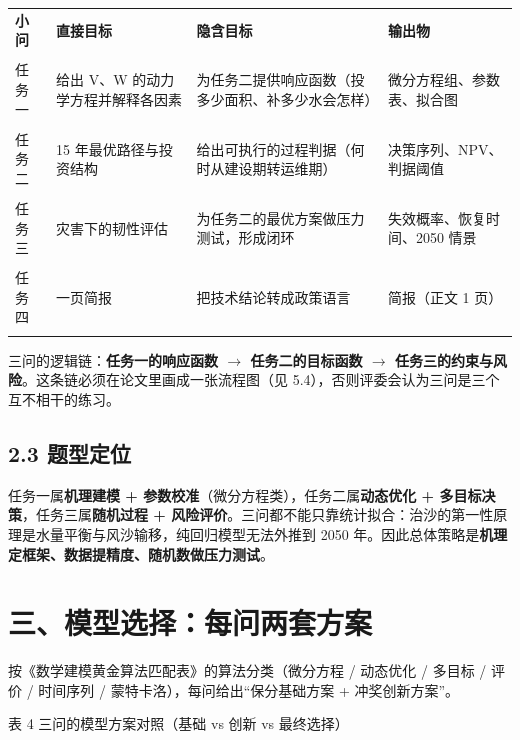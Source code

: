 \documentclass[11pt,a4paper]{ctexart}
\begin{document}
\begin{table}[H]\centering\small\setlength{\parskip}{2pt}
\begin{tabularx}{\textwidth}{|X|X|X|X|}
\toprule
\textbf{小问} & \textbf{直接目标} & \textbf{隐含目标} & \textbf{输出物} \\\\
\midrule
任务一 & 给出 V、W 的动力学方程并解释各因素 & 为任务二提供响应函数（投多少面积、补多少水会怎样） & 微分方程组、参数表、拟合图 \\\\
任务二 & 15 年最优路径与投资结构 & 给出可执行的过程判据（何时从建设期转运维期） & 决策序列、NPV、判据阈值 \\\\
任务三 & 灾害下的韧性评估 & 为任务二的最优方案做压力测试，形成闭环 & 失效概率、恢复时间、2050 情景 \\\\
任务四 & 一页简报 & 把技术结论转成政策语言 & 简报（正文 1 页） \\\\
\bottomrule
\end{tabularx}
\end{table}
三问的逻辑链：\textbf{任务一的响应函数 $\to$ 任务二的目标函数 $\to$ 任务三的约束与风险}。这条链必须在论文里画成一张流程图（见 5.4），否则评委会认为三问是三个互不相干的练习。


\subsection*{2.3 题型定位}
任务一属\textbf{机理建模 + 参数校准}（微分方程类），任务二属\textbf{动态优化 + 多目标决策}，任务三属\textbf{随机过程 + 风险评价}。三问都不能只靠统计拟合：治沙的第一性原理是水量平衡与风沙输移，纯回归模型无法外推到 2050 年。因此总体策略是\textbf{机理定框架、数据提精度、随机数做压力测试}。


\section*{三、模型选择：每问两套方案}
按《数学建模黄金算法匹配表》的算法分类（微分方程 / 动态优化 / 多目标 / 评价 / 时间序列 / 蒙特卡洛），每问给出“保分基础方案 + 冲奖创新方案”。

表 4  三问的模型方案对照（基础 vs 创新 vs 最终选择）
\end{document}

